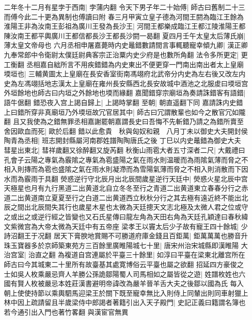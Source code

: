 二年冬十二月有星孛于西南|{
	孛蒲内翻}
令天下男子年二十始傅|{
	師古曰舊制二十三而傅今此二十更為異制也傅讀曰附}
春三月甲寅立皇子德為河間王閼為臨江王餘為淮陽王非為汝南王彭祖為廣川王發為長沙王|{
	河間王都樂成臨江王都江陵淮陽王都陳汝南王都平輿廣川王都信都長沙王都長沙閼一曷翻}
夏四月壬午太皇太后薄氏崩|{
	薄太皇文帝母也}
六月丞相申屠嘉薨時内史鼂錯數請間言事輒聽寵幸傾九卿|{
	漢正卿九奉常郎中令衛尉太僕廷尉典客宗正治粟内史少府是也數所角翻}
法令多所更定|{
	更工衡翻}
丞相嘉自絀所言不用疾錯錯為内史東出不便更穿一門南出南出者太上皇廟堧垣也|{
	三輔黄圖太上皇廟在長安香室街南馮翊府北武帝分内史為左右後又改左内史為左馮翊括地志漢太上皇廟在雍州長安縣西北長安故城中酒池之北服䖍曰堧垣宫外垣餘地也師古曰内垣之外餘地也堧而緣翻}
嘉聞錯穿宗廟垣為奏請誅錯客有語錯|{
	語牛倨翻}
錯恐夜入宫上謁自歸上|{
	上謁時掌翻}
至朝|{
	朝直遥翻下同}
嘉請誅内史錯上曰錯所穿非真廟垣乃外堧垣故冗官居其中|{
	師古曰冗謂散輩也如今之散官冗如隴翻}
且又我使為之錯無罪丞相嘉謝罷朝嘉謂長史曰吾悔不先斬錯乃請之為錯所賣至舍因歐血而死|{
	歐於后翻}
錯以此愈貴　秋與匈奴和親　八月丁未以御史大夫開封侯陶青為丞相|{
	班志開封縣屬河南郡姓譜陶陶唐氏之後}
丁巳以内史鼂錯為御史大夫　彗星出東北|{
	彗祥歲翻又徐醉翻又旋芮翻}
秋衡山雨雹大者五寸深者二尺|{
	大戴禮曰孔會子云陽之專氣為霰隂之專氣為雹盛陽之氣在雨水則温暖而為雨隂氣薄而脅之不相入則摶而為雹也盛隂之氣在雨水則凝滯而為雪陽氣薄而脅之不相入則消散而下因水而為霰雨于具翻}
熒惑逆行守北辰月出北辰間歲星逆行天廷中|{
	熒惑火星北辰中宫天極星也月有九行黑道二出黄道北自立冬冬至行之青道二出黄道東立春春分行之赤道二出黄道南立夏夏至行之白道二出黄道西立秋秋分行之其去極有遠近終不能出北辰之間出北辰間失其行也歲星木星也太微為天廷摠天文志北極及太微人君之位或守之或出之或逆行經之皆變也又石氏星傳曰龍左角為天田右角為天廷孔穎達曰春秋緯文紫微宫為大帝太微為天廷中有五帝座}
梁孝王以竇太后少子故有寵王四十餘城|{
	少詩沼翻王于况翻}
居天下膏腴地賞賜不可勝道府庫金錢且百鉅萬|{
	鉅萬萬萬也勝音升}
珠玉寶器多於京師築東苑方三百餘里廣睢陽城七十里|{
	唐宋州治宋城縣即漢睢陽}
大治宫室|{
	治直之翻}
為複道自宫連屬於平臺三十餘里|{
	如淳曰平臺在梁東北離宫所在師古曰今其城東二十里所有故臺基其處寛博俗云平臺也屬之欲翻}
招延四方豪俊之士如吳人枚乘嚴忌齊人羊勝公孫詭鄒陽蜀人司馬相如之屬皆從之遊|{
	姓譜枚姓也六國有賢人枚被嚴忌本姓莊漢書避明帝諱改為嚴羊晉羊舌大夫之後鄒以國為氏}
每入朝上使使持節以乘輿駟馬迎梁王於關下既至寵幸無比入則侍上同輦出則同車射獵上林中因上疏請留且半歲梁侍中郎謁者著籍引出入天子殿門|{
	史記正義曰籍謂名簿也若今通引出入門也著竹畧翻}
與漢宦官無異

